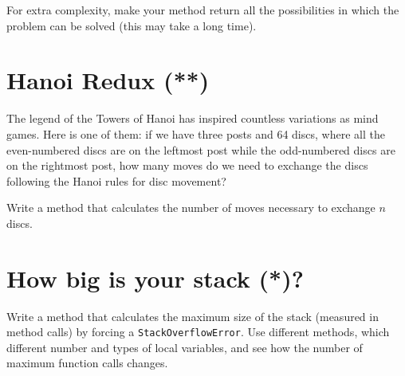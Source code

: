 \documentclass{article}
\begin{document}
For extra complexity, make your method return all the possibilities in
which the problem can be solved (this may take a long time). 

\section{Hanoi Redux (**)}
\label{sec:hanoi-redux}

The legend of the Towers of Hanoi has inspired countless variations as
mind games. Here is one of them: if we have three posts and 64 discs,
where all the even-numbered discs are on the leftmost post while the
odd-numbered discs are on the rightmost post, how many moves do we
need to exchange the discs following the Hanoi rules for disc
movement? 

Write a method that calculates the number of moves necessary to
exchange $n$ discs. 

\section{How big is your stack (*)?}
\label{sec:how-big-your}

Write a method that calculates the maximum size of the stack (measured
in method calls) by forcing a \verb+StackOverflowError+. Use different
methods, which different number and types of local variables, and see
how the number of maximum function calls changes.

\end{document}

